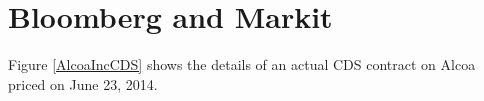 \documentclass[article]{jss}
\begin{document}





\section{Bloomberg and Markit}



Figure \ref{AlcoaIncCDS} shows the details of an actual CDS contract on Alcoa priced on June 23, 2014.
\end{document}
